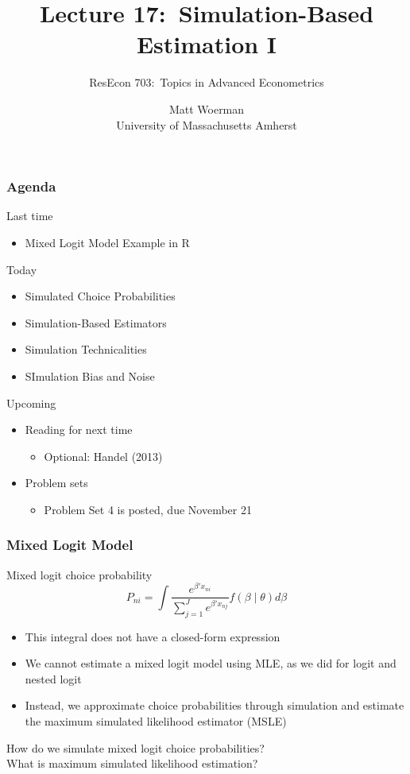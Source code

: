 \documentclass{beamer}
\title[Lecture 17:\ Simulation-Based Estimation I]{Lecture 17:\ Simulation-Based Estimation I}
\author[ResEcon 703:\ Advanced Econometrics]{ResEcon 703:\ Topics in Advanced Econometrics}
\date{Matt Woerman\\University of Massachusetts Amherst}
\begin{document}
{ 
\begin{frame}[noframenumbering]
    \titlepage
\end{frame}
}

\begin{frame}\frametitle{Agenda}
    Last time
    \begin{itemize}
        \item Mixed Logit Model Example in R
    \end{itemize}
    \vspace{2ex}
    Today
    \begin{itemize}
    	\item Simulated Choice Probabilities
        \item Simulation-Based Estimators
        \item Simulation Technicalities
        \item SImulation Bias and Noise
    \end{itemize}
    \vspace{2ex}
    Upcoming
    \begin{itemize}
        \item Reading for next time
        \begin{itemize}
            \item Optional: Handel (2013)
        \end{itemize}
        \item Problem sets
        \begin{itemize}
            \item Problem Set 4 is posted, due November 21
        \end{itemize}
    \end{itemize}
\end{frame}

\begin{frame}\frametitle{Mixed Logit Model}
    Mixed logit choice probability
    $$P_{ni} = \int \frac{e^{\beta' x_{ni}}}{\sum_{j = 1}^J e^{\beta' x_{nj}}} f(\beta \mid \theta) d \beta$$
    \begin{itemize}
        \item This integral does not have a closed-form expression
        \item We cannot estimate a mixed logit model using MLE, as we did for logit and nested logit
        \item Instead, we approximate choice probabilities through simulation and estimate the maximum simulated likelihood estimator (MSLE)
    \end{itemize}
    \vspace{2ex}
    How do we simulate mixed logit choice probabilities? \\
    \vspace{2ex}
    What is maximum simulated likelihood estimation?
\end{frame}
\end{document}
